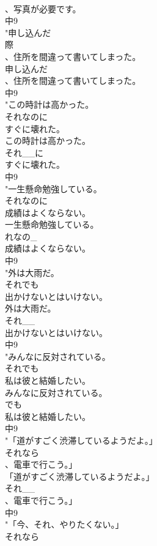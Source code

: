 \documentclass[8pt]{extreport}
\begin{document}
\begin{CJK}{UTF8}{min}
\\	、写真が必要です。
\\	中9
\\	"申し込んだ
\\	際
\\	、住所を間違って書いてしまった。
\\	申し込んだ
\\	、住所を間違って書いてしまった。
\\	中9
\\	"この時計は高かった。
\\	それなのに
\\	すぐに壊れた。
\\	この時計は高かった。
\\	それ__に
\\	すぐに壊れた。
\\	中9
\\	"一生懸命勉強している。
\\	それなのに
\\	成績はよくならない。
\\	一生懸命勉強している。
\\	れなの_
\\	成績はよくならない。
\\	中9
\\	"外は大雨だ。
\\	それでも
\\	出かけないとはいけない。
\\	外は大雨だ。
\\	それ__
\\	出かけないとはいけない。
\\	中9
\\	"みんなに反対されている。
\\	それでも
\\	私は彼と結婚したい。
\\	みんなに反対されている。
\\	でも
\\	私は彼と結婚したい。
\\	中9
\\	"「道がすごく渋滞しているようだよ。」
\\	それなら
\\	、電車で行こう。」
\\	「道がすごく渋滞しているようだよ。」
\\	それ__
\\	、電車で行こう。」
\\	中9
\\	"「今、それ、やりたくない。」
\\	それなら

\end{CJK}
\end{document}
